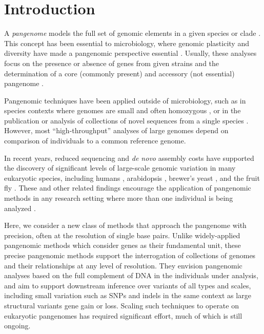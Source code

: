 \section{Introduction}

A \emph{pangenome} models the full set of genomic elements in a given species or clade \cite{sigaux2000cancer}.
This concept has been essential to microbiology, where genomic plasticity and diversity have made a pangenomic perspective essential \cite{tettelin2005genome,medini2005microbial}.
Usually, these analyses focus on the presence or absence of genes from given strains and the determination of a core (commonly present) and accessory (not essential) pangenome \cite{page2015roary}.

Pangenomic techniques have been applied outside of microbiology, such as in species contexts where genomes are small and often homozygous \cite{cao2011whole}, or in the publication or analysis of collections of novel sequences from a single species \cite{gao2019tomato,brohammer2018maize}.
However, most ``high-throughput'' analyses of large genomes depend on comparison of individuals to a common reference genome.

In recent years, reduced sequencing and \emph{de novo} assembly costs have supported the discovery of significant levels of large-scale genomic variation in many eukaryotic species, including humans \cite{li2010building,sudmant2010,sudmant2015integrated,chaisson2018multi}, arabidopsis \cite{alonso2016arabidopsis}, brewer's yeast \cite{yue2017contrasting}, and the fruit fly \cite{chakraborty2018hidden}.
These and other related findings encourage the application of pangenomic methods in any research setting where more than one individual is being analyzed \cite{computational2016computational}.

Here, we consider a new class of methods that approach the pangenome with precision, often at the resolution of single base pairs.
Unlike widely-applied pangenomic methods which consider genes as their fundamental unit, these precise pangenomic methods support the interrogation of collections of genomes and their relationships at any level of resolution.
They envision pangenomic analyses based on the full complement of DNA in the individuals under analysis, and aim to support downstream inference over variants of all types and scales, including small variation such as SNPs and indels in the same context as large structural variants gene gain or loss.
Scaling such techniques to operate on eukaryotic pangenomes has required significant effort, much of which is still ongoing.

